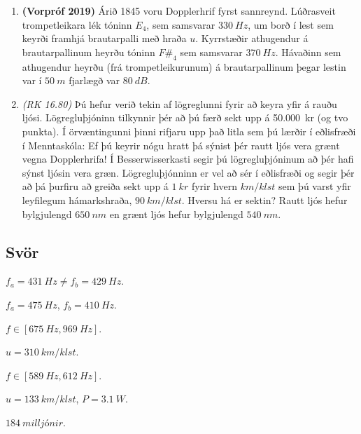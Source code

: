 \begin{enumerate}[label = \textbf{Dæmi \thechapter.\arabic*.}]
\item \textbf{(Vorpróf 2019)} Árið 1845 voru Dopplerhrif fyrst sannreynd. Lúðrasveit trompetleikara lék tóninn $E_4$, sem samsvarar $\SI{330}{Hz}$, um borð í lest sem keyrði framhjá brautarpalli með hraða $u$. Kyrrstæðir athugendur á brautarpallinum heyrðu tóninn $F\#_4$ sem samsvarar $\SI{370}{Hz}$. Hávaðinn sem athugendur heyrðu (frá trompetleikurunum) á brautarpallinum þegar lestin var í $\SI{50}{m}$ fjarlægð var $\SI{80}{dB}$. 

\item \textit{(RK 16.80)} Þú hefur verið tekin af lögreglunni fyrir að keyra yfir á rauðu ljósi. Lögregluþjóninn tilkynnir þér að þú færð sekt upp á \SI{50.000}{kr} (og tvo punkta). Í örvæntingunni þinni rifjaru upp það litla sem þú lærðir í eðlisfræði í Menntaskóla: Ef þú keyrir nógu hratt þá sýnist þér rautt ljós vera grænt vegna Dopplerhrifa! Í Besserwisserkasti segir þú lögregluþjóninum að þér hafi sýnst ljósin vera græn. Lögregluþjónninn er vel að sér í eðlisfræði og segir þér að þá þurfiru að greiða sekt upp á $\SI{1}{kr}$ fyrir hvern $\si{km/klst}$ sem þú varst yfir leyfilegum hámarkshraða, $\SI{90}{km/klst}$. Hversu há er sektin? Rautt ljós hefur bylgjulengd $\SI{650}{nm}$ en grænt ljós hefur bylgjulengd $\SI{540}{nm}$.


\end{enumerate}

\subsection*{Svör}

\begin{enumerate*}[label = \vspace{0.15cm} \textbf{(\arabic*)}]
    \setcounter{enumi}{21}
  \item $f_a = \SI{431}{Hz} \neq f_b = \SI{429}{Hz}$.
  \item $f_a = \SI{475}{Hz}$, $f_b = \SI{410}{Hz}$.
  \item $f \in [\SI{675}{Hz}, \SI{969}{Hz}]$.
  \item $u = \SI{310}{km/klst}$.
  \item $f \in [\SI{589}{Hz}, \SI{612}{Hz}]$.
  \item $u = \SI{133}{km/klst}$, $P = \SI{3.1}{W}$.
  \item $\SI{184}{milljónir}$.
\end{enumerate*}


